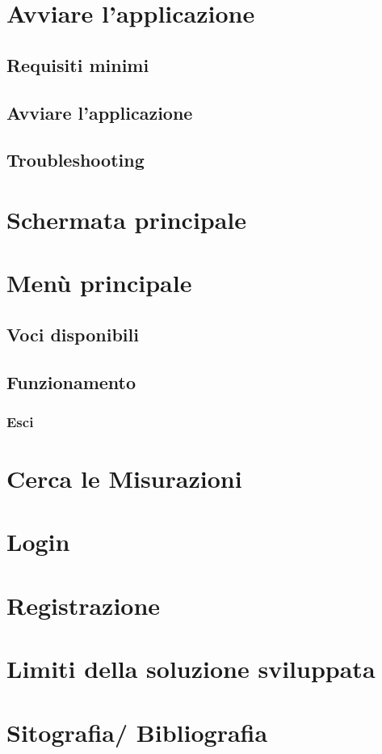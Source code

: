 \documentclass[a4paper,12pt]{article}
\begin{document}
	\newpage
			
	\section{Avviare l'applicazione}
	
		\subsection{Requisiti minimi}
		
		\subsection{Avviare l'applicazione}
		
		\subsection{Troubleshooting}
		
	\newpage
		
	\section{Schermata principale}
	
	\newpage
	
	\section{Menù principale}
	\subsection{Voci disponibili}
	\subsection{Funzionamento}
			\subsubsection{Esci}
			
	\newpage
	
	\section{Cerca le Misurazioni}
	\section{Login}
	\section{Registrazione}

	\section{Limiti della soluzione sviluppata}
	\section{Sitografia/ Bibliografia}
	

		
	
	

	

	

	
	
	
	
	
\end{document}

